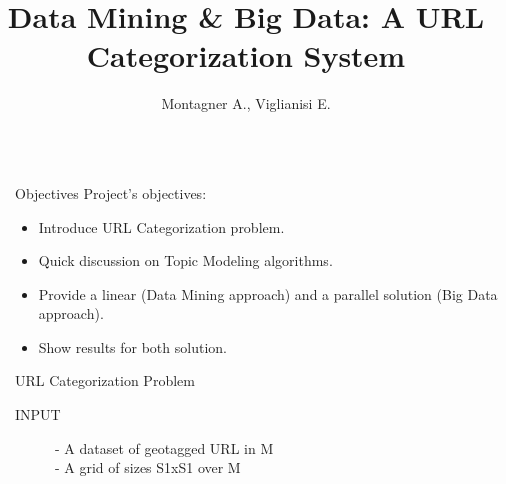 \documentclass[final]{beamer}
\title{Data Mining \& Big Data: A URL Categorization System} %
\author{Montagner A., Viglianisi E.} %
\institute{University of Trento, 2017} %
\newlength{\sepwid}
\newlength{\onecolwid}
\begin{document}

\setlength{\belowcaptionskip}{2ex} %
\setlength\belowdisplayshortskip{2ex} %

\begin{frame}[t] %

\begin{columns}[t] %

\begin{column}{\sepwid}\end{column} %

\begin{column}{\onecolwid} %


\begin{alertblock}{Objectives}
Project's objectives:
\begin{itemize}
\item Introduce URL Categorization problem.
\item Quick discussion on Topic Modeling algorithms.
\item Provide a linear (Data Mining approach) and a parallel solution (Big Data approach).
\item Show results for both solution.
\end{itemize}

\end{alertblock}


\begin{block}{URL Categorization Problem}

	\begin{description}
    	\item [INPUT] - A dataset of geotagged URL in M\\ 
					  - A grid of sizes S1xS1 over M
		

\end{description}
\end{block}
\end{column}
\end{columns}
\end{frame}
\end{document}
